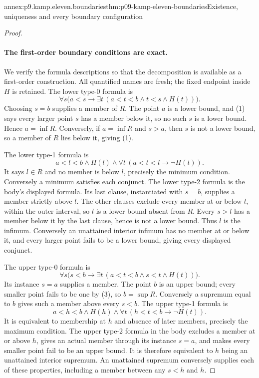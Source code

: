 \begin{annexitem}{annex:p9.kamp.eleven.boundaries}{thm:p09-kamp-eleven-boundaries}{Existence, uniqueness and every boundary configuration}
\begin{proof}
\paragraph{The first-order boundary conditions are exact.}
We verify the formula descriptions so that the decomposition is
available as a first-order construction. All quantified names are
fresh; the fixed endpoint inside \(H\) is retained.
The lower type-0 formula is
\[
 \forall s\bigl(a<s\to
       \exists t\,(a<t<b\land t<s\land H(t))\bigr).
 \tag{1}
\]
Choosing \(s=b\) supplies a member of \(R\).
The point \(a\) is a lower bound, and (1) says every larger
point \(s\) has a member below it, so no such \(s\) is
a lower bound. Hence \(a=\inf R\). Conversely, if
\(a=\inf R\) and \(s>a\), then \(s\) is not a lower
bound, so a member of \(R\) lies below it, giving (1).

The lower type-1 formula is
\[
 a<l<b\land H(l)\land
                  \forall t\,(a<t<l\to\neg H(t)).
 \tag{2}
\]
It says \(l\in R\) and no member is below \(l\), precisely
the minimum condition. Conversely a minimum satisfies each conjunct.
The lower type-2 formula is the body's displayed formula. Its last
clause, instantiated with \(s=b\), supplies a member strictly
above \(l\). The other clauses exclude every member at or
below \(l\), within the outer interval, so \(l\) is a
lower bound absent from \(R\). Every \(s>l\) has a member
below it by the last clause, hence is not a lower bound. Thus
\(l\) is the infimum. Conversely an unattained interior infimum
has no member at or below it, and every larger point fails to be
a lower bound, giving every displayed conjunct.

The upper type-0 formula is
\[
 \forall s\bigl(s<b\to
       \exists t\,(a<t<b\land s<t\land H(t))\bigr).
 \tag{3}
\]
Its instance \(s=a\) supplies a member. The point \(b\)
is an upper bound; every smaller point fails to be one by (3),
so \(b=\sup R\). Conversely a supremum equal to \(b\)
gives such a member above every \(s<b\).
The upper type-1 formula is
\[
 a<h<b\land H(h)\land
                  \forall t\,(h<t<b\to\neg H(t)).
 \tag{4}
\]
It is equivalent to membership at \(h\) and absence of later
members, precisely the maximum condition. The upper type-2 formula
in the body excludes a member at or above \(h\), gives an
actual member through its instance \(s=a\), and makes every
smaller point fail to be an upper bound. It is therefore equivalent
to \(h\) being an unattained interior supremum. An unattained
supremum conversely supplies each of these properties, including a
member between any \(s<h\) and \(h\).


\end{proof}
\end{annexitem}
